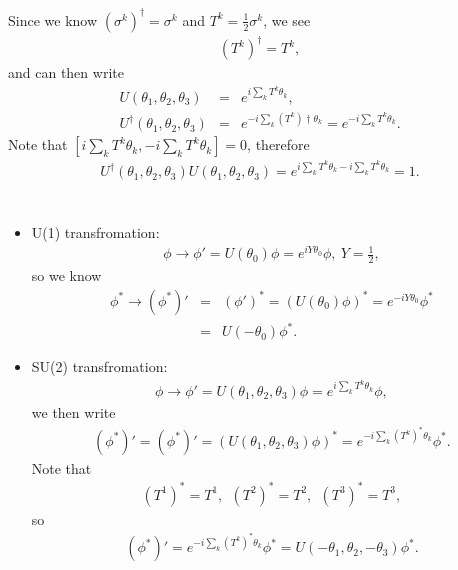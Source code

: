 \documentclass[11pt]{article}
\begin{document}
\section{ } \label{sec:udu}
Since we know $(\sigma^k)^\dagger = \sigma^k$ and $T^k=\frac{1}{2}\sigma^k$, we see
\begin{eqnarray}
  (T^k)^\dagger=T^k,
\end{eqnarray}
and can then write
\begin{eqnarray}
  U (\theta_1,\theta_2,\theta_3)&=&e^{i\sum_k T^k \theta_k},\nonumber \\
  U^\dagger (\theta_1,\theta_2,\theta_3)&=&e^{-i\sum_k (T^k)\dagger \theta_k}= e^{-i\sum_k T^k \theta_k}.
\end{eqnarray}
Note that $[i\sum_k T^k \theta_k,-i\sum_k T^k \theta_k]=0$, therefore
\begin{eqnarray}
  U^\dagger (\theta_1,\theta_2,\theta_3) U (\theta_1,\theta_2,\theta_3) = e^{i\sum_k T^k \theta_k -i\sum_k T^k \theta_k}=1.
\end{eqnarray}

\section{  }

\begin{itemize}
  \item U(1) transfromation:
  \begin{eqnarray}
    \phi \to \phi'= U(\theta_0) \phi= e^{i Y \theta_0} \phi, ~ Y=\frac{1}{2},
  \end{eqnarray}
 so we know
 \begin{eqnarray}
  \phi^* \to (\phi^*)' &=& (\phi')^*= (U(\theta_0) \phi)^*= e^{-i Y \theta_0} \phi^*\nonumber \\
  &=& U(-\theta_0) \phi^*.
 \end{eqnarray}
  \item SU(2) transfromation:
  \begin{eqnarray}
    \phi \to \phi'=U(\theta_1,\theta_2,\theta_3)\phi =e^{i\sum_k T^k \theta_k} \phi,
  \end{eqnarray}
  we then write
  \begin{eqnarray}
    (\phi^*)'= (\phi^*)'=(U(\theta_1,\theta_2,\theta_3)\phi)^* =e^{-i\sum_k (T^k)^* \theta_k} \phi^*.
  \end{eqnarray}
Note that
\begin{eqnarray}
  (T^1)^*=T^1,~~(T^2)^*=T^2,~~(T^3)^*=T^3,
\end{eqnarray}
so 
\begin{eqnarray}
  (\phi^*)'=e^{-i\sum_k (T^k)^* \theta_k} \phi^*=U(-\theta_1,\theta_2,-\theta_3) \phi^*.
\end{eqnarray}
\end{itemize}
\end{document}

